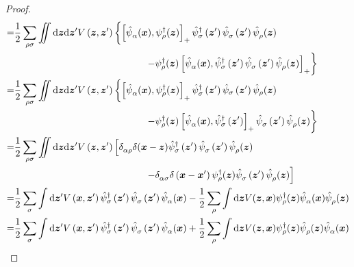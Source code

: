 \begin{proof}
\begin{align}
=& \frac{1}{2} \sum_{\rho \sigma} \iint \mathrm{d} \vct{z} \mathrm{d} \vct{z}^{\prime} V\left(\vct{z}, \vct{z}^{\prime}\right)\left\{\left[\hat{\psi}^{ }_\alpha(\vct{x}), \psi_\rho^{\dg}(\vct{z})\right]_{+} \hat{\psi}_\sigma^{\dg}\left(\vct{z}^{\prime}\right) \hat{\psi}^{ }_\sigma\left(\vct{z}^{\prime}\right) \hat{\psi}^{ }_\rho(\vct{z})\right. \nonumber\\
& ~~~~~~~~~~~~~~~~~~~~~~~~~~~~~~~~~~~~~~~~~\left.-\psi_\rho^{\dg}(\vct{z})\left[\hat{\psi}^{ }_\alpha(\vct{x}), \hat{\psi}_\sigma^{\dg}\left(\vct{z}^{\prime}\right) \hat{\psi}^{ }_\sigma\left(\vct{z}^{\prime}\right) \hat{\psi}^{ }_\rho(\vct{z})\right]_{+}\right\} \nonumber\\
=& \frac{1}{2} \sum_{\rho \sigma} \iint \mathrm{d} \vct{z} \mathrm{d} \vct{z}^{\prime} V\left(\vct{z}, \vct{z}^{\prime}\right)\left\{\left[\hat{\psi}^{ }_\alpha(\vct{x}), \psi_\rho^{\dg}(\vct{z})\right]_{+} \hat{\psi}_\sigma^{\dg}\left(\vct{z}^{\prime}\right) \hat{\psi}_\sigma\left(\vct{z}^{\prime}\right) \hat{\psi}_\rho(\vct{z})\right. \nonumber\\
&  ~~~~~~~~~~~~~~~~~~~~~~~~~~~~~~~~~~~~~~~~~\left.-\psi_\rho^{\dg}(\vct{z})\left[\hat{\psi}^{ }_\alpha(\vct{x}), \hat{\psi}_\sigma^{\dg}\left(\vct{z}^{\prime}\right)\right]_{+} \hat{\psi}^{ }_\sigma\left(\vct{z}^{\prime}\right) \hat{\psi}^{ }_\rho(\vct{z})\right\} \nonumber\\
=& \frac{1}{2} \sum_{\rho \sigma} \iint \mathrm{d} \vct{z} \mathrm{d} \vct{z}^{\prime} V\left(\vct{z}, \vct{z}^{\prime}\right)\left[\delta^{ }_{\alpha \rho} \delta(\vct{x}-\vct{z}) \hat{\psi}_\sigma^{\dg}\left(\vct{z}^{\prime}\right) \hat{\psi}^{ }_\sigma\left(\vct{z}^{\prime}\right) \hat{\psi}^{ }_\rho(\vct{z})\right.\nonumber \\
&  ~~~~~~~~~~~~~~~~~~~~~~~~~~~~~~~~~~~~~~~~~\left.-\delta^{ }_{\alpha \sigma} \delta\left(\vct{x}-\vct{x}^{\prime}\right) \psi_\rho^{\dg}(\vct{z}) \hat{\psi}^{ }_\sigma\left(\vct{z}^{\prime}\right) \hat{\psi}^{ }_\rho(\vct{z})\right] \nonumber\\
=& \frac{1}{2} \sum_\sigma \int \mathrm{d} \vct{z}^{\prime} V\left(\vct{x}, \vct{z}^{\prime}\right) \hat{\psi}_\sigma^{\dg}\left(\vct{z}^{\prime}\right) \hat{\psi}^{ }_\sigma\left(\vct{z}^{\prime}\right) \hat{\psi}^{ }_\alpha(\vct{x})-\frac{1}{2} \sum_\rho \int \mathrm{d} \vct{z} V(\vct{z}, \vct{x}) \psi_\rho^{\dg}(\vct{z}) \hat{\psi}^{ }_\alpha(\vct{x}) \hat{\psi}^{ }_\rho(\vct{z}) \nonumber\\
=& \frac{1}{2} \sum_\sigma \int \mathrm{d} \vct{z}^{\prime} V\left(\vct{x}, \vct{z}^{\prime}\right) \hat{\psi}_\sigma^{\dg}\left(\vct{z}^{\prime}\right) \hat{\psi}^{ }_\sigma\left(\vct{z}^{\prime}\right) \hat{\psi}^{ }_\alpha(\vct{x})+\frac{1}{2} \sum_\rho \int \mathrm{d} \vct{z} V(\vct{z}, \vct{x}) \psi_\rho^{\dg}(\vct{z}) \hat{\psi}^{ }_\rho(\vct{z}) \hat{\psi}^{ }_\alpha(\vct{x}) \nonumber\\

\end{align}
\end{proof}
